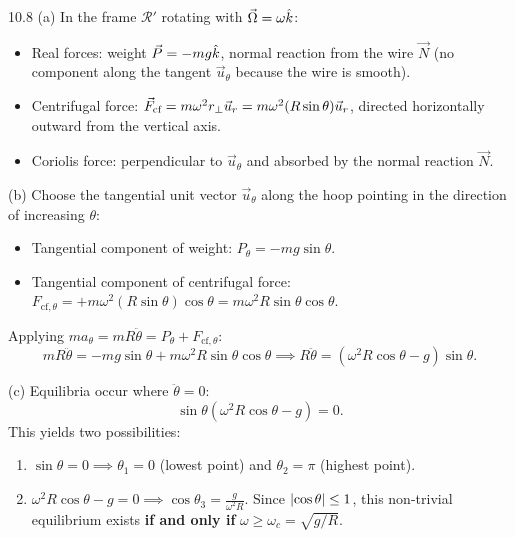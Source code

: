 \begin{solution}{10.8}
(a) In the frame $\mathcal{R}'$ rotating with $\vec{\Omega} = \omega\hat{k}$:
\begin{itemize}[leftmargin=1.4em,itemsep=2pt]
  \item Real forces: weight $\vec{P} = -mg\hat{k}$, normal reaction from the wire $\vec{N}$ (no component along the tangent $\vec{u}_\theta$ because the wire is smooth).
  \item Centrifugal force: $\vec{F}_{\text{cf}} = m\omega^2 r_\perp\vec{u}_r = m\omega^2(R\sin\theta)\vec{u}_r$, directed horizontally outward from the vertical axis.
  \item Coriolis force: perpendicular to $\vec{u}_\theta$ and absorbed by the normal reaction $\vec{N}$.
\end{itemize}

(b) Choose the tangential unit vector $\vec{u}_\theta$ along the hoop pointing in the direction of increasing $\theta$:
\begin{itemize}[leftmargin=1.4em,itemsep=2pt]
  \item Tangential component of weight: $P_\theta = -mg\sin\theta$.
  \item Tangential component of centrifugal force: $F_{\text{cf}, \theta} = +m\omega^2(R\sin\theta)\cos\theta = m\omega^2 R\sin\theta\cos\theta$.
\end{itemize}
Applying $m a_\theta = m R\ddot{\theta} = P_\theta + F_{\text{cf}, \theta}$:
\[
m R\ddot{\theta} = -mg\sin\theta + m\omega^2 R\sin\theta\cos\theta \implies \boxed{R\ddot{\theta} = \left(\omega^2 R\cos\theta - g\right)\sin\theta.}
\]

(c) Equilibria occur where $\ddot{\theta} = 0$:
\[
\sin\theta\left(\omega^2 R\cos\theta - g\right) = 0.
\]
This yields two possibilities:
\begin{enumerate}[leftmargin=1.4em,itemsep=2pt]
  \item $\sin\theta = 0 \implies \theta_1 = 0$ (lowest point) and $\theta_2 = \pi$ (highest point).
  \item $\omega^2 R\cos\theta - g = 0 \implies \cos\theta_3 = \frac{g}{\omega^2 R}$.
  Since $\left\lvert \cos\theta \right\rvert \le 1$, this non-trivial equilibrium exists \textbf{if and only if} $\omega \ge \omega_c = \sqrt{g/R}$.
\end{enumerate}


\end{solution}

